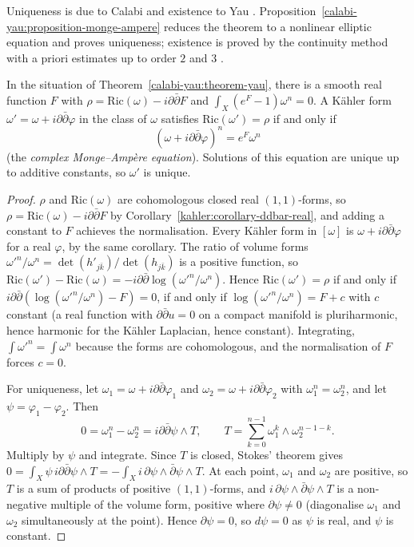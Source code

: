 Uniqueness is due to Calabi and existence to Yau \cite{yau-1978}. Proposition~\ref{calabi-yau:proposition-monge-ampere} reduces the theorem to a nonlinear elliptic
equation and proves uniqueness; existence is proved by the continuity method with a priori estimates up to order $2$ and $3$ \cite[Chapter 5]{joyce-special-holonomy}.

\begin{proposition}\label{calabi-yau:proposition-monge-ampere}
In the situation of Theorem~\ref{calabi-yau:theorem-yau}, there is a smooth real function $F$ with $\rho = \mathrm{Ric}(\omega) - i\partial\bar\partial F$ and
$\int_X(e^F - 1)\omega^n = 0$. A K\"ahler form $\omega' = \omega + i\partial\bar\partial\varphi$ in the class of $\omega$ satisfies $\mathrm{Ric}(\omega') = \rho$ if and only if
\[
(\omega + i\partial\bar\partial\varphi)^n = e^F\omega^n
\]
(the \emph{complex Monge--Amp\`ere equation}). Solutions of this equation are unique up to additive constants, so $\omega'$ is unique.
\end{proposition}

\begin{proof}
$\rho$ and $\mathrm{Ric}(\omega)$ are cohomologous closed real $(1,1)$-forms, so $\rho = \mathrm{Ric}(\omega) - i\partial\bar\partial F$ by
Corollary~\ref{kahler:corollary-ddbar-real}, and adding a constant to $F$ achieves the normalisation. Every K\"ahler form in $[\omega]$ is
$\omega + i\partial\bar\partial\varphi$ for a real $\varphi$, by the same corollary. The ratio of volume forms $\omega'^n/\omega^n = \det(h'_{j\bar k})/\det(h_{j\bar k})$ is a
positive function, so $\mathrm{Ric}(\omega') - \mathrm{Ric}(\omega) = -i\partial\bar\partial\log(\omega'^n/\omega^n)$. Hence $\mathrm{Ric}(\omega') = \rho$ if and only if
$i\partial\bar\partial(\log(\omega'^n/\omega^n) - F) = 0$, if and only if $\log(\omega'^n/\omega^n) = F + c$ with $c$ constant (a real function with $\partial\bar\partial u = 0$
on a compact manifold is pluriharmonic, hence harmonic for the K\"ahler Laplacian, hence constant). Integrating, $\int\omega'^n = \int\omega^n$ because the forms are cohomologous,
and the normalisation of $F$ forces $c = 0$.

For uniqueness, let $\omega_1 = \omega + i\partial\bar\partial\varphi_1$ and $\omega_2 = \omega + i\partial\bar\partial\varphi_2$ with $\omega_1^n = \omega_2^n$, and let $\psi = \varphi_1 - \varphi_2$. Then
\[
0 = \omega_1^n - \omega_2^n = i\partial\bar\partial\psi \wedge T, \qquad T = \sum_{k=0}^{n-1}\omega_1^k \wedge \omega_2^{n-1-k} .
\]
Multiply by $\psi$ and integrate. Since $T$ is closed, Stokes' theorem gives
$0 = \int_X\psi\,i\partial\bar\partial\psi \wedge T = -\int_Xi\,\partial\psi \wedge \bar\partial\psi \wedge T$. At each point, $\omega_1$ and $\omega_2$ are positive, so $T$ is a sum of
products of positive $(1,1)$-forms, and $i\,\partial\psi \wedge \bar\partial\psi \wedge T$ is a non-negative multiple of the volume form, positive where $\partial\psi \neq 0$ (diagonalise
$\omega_1$ and $\omega_2$ simultaneously at the point). Hence $\partial\psi = 0$, so $d\psi = 0$ as $\psi$ is real, and $\psi$ is constant.
\end{proof}

